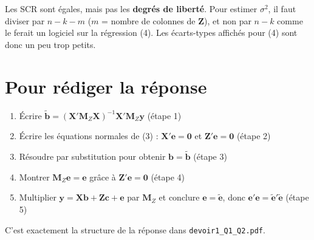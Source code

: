\documentclass[11pt,a4paper]{article}
\newcommand{\vy}{\mathbf{y}}\newcommand{\vX}{\mathbf{X}}\newcommand{\vZ}{\mathbf{Z}}
\newcommand{\ve}{\mathbf{e}}\newcommand{\vb}{\mathbf{b}}\newcommand{\vc}{\mathbf{c}}
\newcommand{\Mz}{\mathbf{M}_Z}\newcommand{\Pz}{\mathbf{P}_Z}
\begin{document}
\begin{attention}
Les SCR sont égales, mais pas les \textbf{degrés de liberté}. Pour estimer $\sigma^2$, il faut diviser par $n-k-m$ ($m$ = nombre de colonnes de $\vZ$), et non par $n-k$ comme le ferait un logiciel sur la régression (4). Les écarts-types affichés pour (4) sont donc un peu trop petits.
\end{attention}

\section{Pour rédiger la réponse}

\begin{enumerate}
\item Écrire $\tilde{\vb}=(\vX'\Mz\vX)^{-1}\vX'\Mz\vy$ \hfill (étape 1)
\item Écrire les équations normales de (3) : $\vX'\ve=\mathbf 0$ et $\vZ'\ve=\mathbf 0$ \hfill (étape 2)
\item Résoudre par substitution pour obtenir $\vb=\tilde{\vb}$ \hfill (étape 3)
\item Montrer $\Mz\ve=\ve$ grâce à $\vZ'\ve=\mathbf 0$ \hfill (étape 4)
\item Multiplier $\vy=\vX\vb+\vZ\vc+\ve$ par $\Mz$ et conclure $\ve=\tilde{\ve}$, donc $\ve'\ve=\tilde{\ve}'\tilde{\ve}$ \hfill (étape 5)
\end{enumerate}
C'est exactement la structure de la réponse dans \texttt{devoir1\_Q1\_Q2.pdf}.
\end{document}
